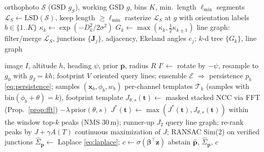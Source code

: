 \begin{algorithm}[t]
\caption{Offline map preparation (training-free)}
\label{alg:offline}
\begin{algorithmic}[1]
\Require orthophoto $\mathcal S$ (GSD $g_S$), working GSD $g$, bins $K$, min.\ length $\ell_{\min}$
\State segments $\mathcal L_S\gets\mathrm{LSD}(\mathcal S)$, keep length $\ge\ell_{\min}$
\State rasterize $\mathcal L_S$ at $g$ with orientation labels $b\in\{1..K\}$
 $\kappa_k\gets\exp(-D_k^2/2\sigma^2)$ \EndFor
\State $G_k\gets\max(\kappa_k,\tfrac12\kappa_{k\pm1})$ 
\State line graph: filter/merge $\mathcal L_S$, junctions $\{\mathbf J_j\}$, adjacency, Ekeland angles $e_j$; $k$-d tree
\State \Return $\{G_k\}$, line graph
\end{algorithmic}
\end{algorithm}

\begin{algorithm}[t]
\caption{Online localization of one UAV frame}
\label{alg:online}
\begin{algorithmic}[1]
\Require image $I$, altitude $h$, heading $\psi$, prior $\bar{\mathbf p}$, radius $R$
\State $I'\gets$ rotate by $-\psi$, resample to $g_0$ with $g_I=kh$; footprint $V$
\State oriented query lines; ensemble $\mathcal E$ $\Rightarrow$ persistence $p_b$ \eqref{eq:persistence}; samples $(\mathbf x_b,\phi_b,w_b)$
 
  \State per-channel templates $\mathcal T_k$ (samples with $\mathrm{bin}(\phi_b+\theta)=k$), footprint template
  \State $J_{\theta,s}(\mathbf t)\gets$ masked stacked NCC via FFT (Prop.~\ref{prop:fft}) $-\lambda\,\mathrm{prior}(\theta,s)$
  \State $J^\ast(\mathbf t)\gets\max(J^\ast(\mathbf t),J_{\theta,s}(\mathbf t))$ within the window
\EndFor
\State top-$k$ peaks (NMS 30\,m); runner-up $J_2$
\State query line graph; re-rank peaks by $J+\gamma A(T)$ 
\State continuous maximization of $J$; RANSAC Sim(2) on verified junctions
\State $\hat\Sigma_{\mathbf p}\gets$ Laplace \eqref{eq:laplace}; $c\gets\sigma(\boldsymbol\beta^\top\mathbf z)$
 \Return abstain \EndIf
\State \Return $\hat{\mathbf p}$, $\hat\Sigma_{\mathbf p}$, $c$
\end{algorithmic}
\end{algorithm}
